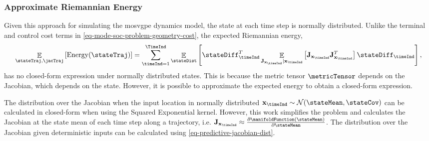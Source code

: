 \documentclass{mimosis-class/mimosis}
\numberwithin{equation}{chapter}
\DeclareMathOperator{\E}{\mathbb{E}}
\newcommand{\state}{\ensuremath{\mathbf{x}}}
\newcommand{\Jac}{\ensuremath{\mathbf{J}}}
\begin{document}
{\subsubsection{Approximate Riemannian Energy}
\label{sec:org4da9480}
Given this approach for simulating the \acrshort{mosvgpe} dynamics model, the state at each time step is normally distributed.
Unlike the terminal and control cost terms in \cref{eq-mode-soc-problem-geometry-cost}, the expected Riemannian
energy,
\begin{align} \label{eq-trajectory-riemannian-energy}
\E_{\stateTraj, \jacTraj} \left[ \text{Energy}(\stateTraj) \right]
= \sum_{\timeInd=1}^\TimeInd
\E_{\stateDist}\left[ \stateDiff_\timeInd^T
\E_{\Jac_{\state_{\timeInd}} \mid \state_{\timeInd}}\left[ \Jac_{\state_\timeInd} \Jac_{\state_\timeInd}^T \right]
 \stateDiff_\timeInd \right],
\end{align}
has no closed-form expression under normally distributed states.
This is because the metric tensor \(\metricTensor\) depends on the Jacobian, which depends on the state.
However, it is possible to approximate the expected energy to obtain a closed-form expression.

The distribution over the Jacobian when the input location in normally distributed
\(\state_{\timeInd} \sim \mathcal{N}(\stateMean, \stateCov)\) can be calculated in closed-form when using the
Squared Exponential kernel.
However, this work simplifies the problem and calculates the Jacobian at the state mean of each time step
along a trajectory, i.e.
\(\Jac_{\state_{\timeInd}} \approx \frac{\partial \manifoldFunction(\stateMean)}{\partial \stateMean}\).
The distribution over the Jacobian given deterministic inputs can be calculated using \cref{eq-predictive-jacobian-dist}.

}
\end{document}
